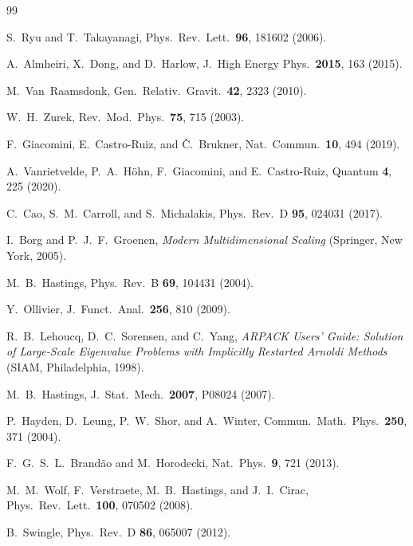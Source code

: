 \documentclass[aps,pra,twocolumn,superscriptaddress]{revtex4-2}
\begin{document}
\begin{thebibliography}{99}

S.~Ryu and T.~Takayanagi, Phys.\ Rev.\ Lett.\ \textbf{96}, 181602 (2006).

A.~Almheiri, X.~Dong, and D.~Harlow, J.\ High Energy Phys.\ \textbf{2015}, 163 (2015).

M.~Van~Raamsdonk, Gen.\ Relativ.\ Gravit.\ \textbf{42}, 2323 (2010).

W.~H.~Zurek, Rev.\ Mod.\ Phys.\ \textbf{75}, 715 (2003).

F.~Giacomini, E.~Castro-Ruiz, and \v{C}.~Brukner, Nat.\ Commun.\ \textbf{10}, 494 (2019).

A.~Vanrietvelde, P.~A.~H\"ohn, F.~Giacomini, and E.~Castro-Ruiz, Quantum \textbf{4}, 225 (2020).

C.~Cao, S.~M.~Carroll, and S.~Michalakis, Phys.\ Rev.\ D \textbf{95}, 024031 (2017).

I.~Borg and P.~J.~F.~Groenen, \textit{Modern Multidimensional Scaling} (Springer, New York, 2005).

M.~B.~Hastings, Phys.\ Rev.\ B \textbf{69}, 104431 (2004).

Y.~Ollivier, J.\ Funct.\ Anal.\ \textbf{256}, 810 (2009).

R.~B.~Lehoucq, D.~C.~Sorensen, and C.~Yang, \textit{ARPACK Users' Guide: Solution of Large-Scale Eigenvalue Problems with Implicitly Restarted Arnoldi Methods} (SIAM, Philadelphia, 1998).

M.~B.~Hastings, J.\ Stat.\ Mech.\ \textbf{2007}, P08024 (2007).

P.~Hayden, D.~Leung, P.~W.~Shor, and A.~Winter, Commun.\ Math.\ Phys.\ \textbf{250}, 371 (2004).

F.~G.~S.~L.~Brand\~ao and M.~Horodecki, Nat.\ Phys.\ \textbf{9}, 721 (2013).

M.~M.~Wolf, F.~Verstraete, M.~B.~Hastings, and J.~I.~Cirac, Phys.\ Rev.\ Lett.\ \textbf{100}, 070502 (2008).

B.~Swingle, Phys.\ Rev.\ D \textbf{86}, 065007 (2012).

\end{thebibliography}
\end{document}
